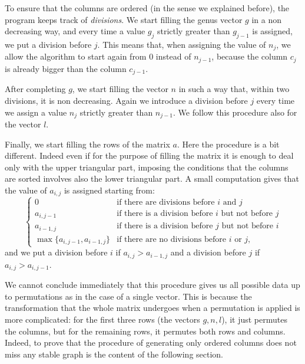 \documentclass{amsart}
\theoremstyle{plain}
\theoremstyle{definition}
\begin{document}
To ensure that the columns are ordered (in the sense we explained
before), the program keeps track of \emph{divisions}. We start filling
the genus vector $g$ in a non decreasing way, and every time a value
$g_j$ strictly greater than $g_{j-1}$ is assigned, we put a division
before $j$.
This means that, when assigning the value of $n_j$, we allow
the algorithm to start again from $0$ instead of $n_{j-1}$, because the column
$c_j$ is already bigger than the column $c_{j-1}$.

After completing $g$, we start filling the vector $n$ in such a way
that, within two divisions, it is non decreasing. Again we introduce a
division before $j$ every time we assign a value $n_j$ strictly
greater than $n_{j-1}$. We follow this procedure also for the vector
$l$.

Finally, we start filling the rows of the matrix $a$. Here the
procedure is a bit different. Indeed even if for the purpose of filling
the matrix it is enough to deal only with the upper triangular part,
imposing the conditions that the columns are sorted involves also the
lower triangular part. A small computation gives that the value of
$a_{i,j}$ is assigned starting from:
\[
\begin{cases}
  0 & \text{if there are divisions before $i$ and $j$}\\
  a_{i,j-1} & \text{if there is a division before $i$ but not before
    $j$}\\
  a_{i-1,j} & \text{if there is a division before $j$ but not before
    $i$}\\
  \max\{a_{i,j-1}, a_{i-1,j}\} & \text{if there are no divisions
    before $i$ or $j$,}
\end{cases}
\]
and we put a division before $i$ if $a_{i,j} > a_{i-1,j}$ and a division
before $j$ if $a_{i,j} > a_{i,j-1}$.

We cannot conclude immediately that this procedure gives us all
possible data up to permutations as in the case of a single
vector. This is because the transformation that the whole matrix undergoes
when a permutation is applied is more complicated: for the first three
rows (the vectors $g,n,l$), it just permutes the columns, but for the 
remaining rows, it permutes both rows and columns. Indeed, to prove that 
the procedure of generating only ordered columns does not miss any stable 
graph is the content of the following section.
\end{document}

